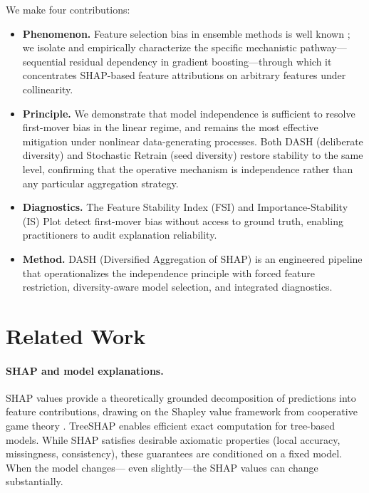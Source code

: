 \documentclass[11pt]{article}
\newcommand{\dash}{\textsc{DASH}}
\begin{document}
We make four contributions:
\begin{itemize}
  \item \textbf{Phenomenon.} Feature selection bias in ensemble methods
    is well known \citep{strobl2007bias, hooker2019please}; we isolate
    and empirically characterize the specific mechanistic
    pathway---sequential residual dependency in gradient
    boosting---through which it concentrates SHAP-based feature
    attributions on arbitrary features under collinearity.
  \item \textbf{Principle.} We demonstrate that model independence is
    sufficient to resolve first-mover bias in the linear regime, and
    remains the most effective mitigation under nonlinear
    data-generating processes.  Both \dash{} (deliberate diversity) and
    Stochastic Retrain (seed diversity) restore stability to the same
    level, confirming that the operative mechanism is independence
    rather than any particular aggregation strategy.
  \item \textbf{Diagnostics.} The Feature Stability Index (FSI) and
    Importance-Stability (IS) Plot detect first-mover bias without
    access to ground truth, enabling practitioners to audit explanation
    reliability.
  \item \textbf{Method.} \dash{} (Diversified Aggregation of SHAP) is
    an engineered pipeline that operationalizes the independence principle
    with forced feature restriction, diversity-aware model selection,
    and integrated diagnostics.
\end{itemize}


\section{Related Work}
\label{sec:related}

\paragraph{SHAP and model explanations.}
SHAP values \citep{lundberg2017unified} provide a theoretically grounded
decomposition of predictions into feature contributions, drawing on the
Shapley value framework from cooperative game theory
\citep{shapley1953value}. TreeSHAP \citep{lundberg2020local} enables
efficient exact computation for tree-based models. While SHAP satisfies
desirable axiomatic properties (local accuracy, missingness, consistency),
these guarantees are conditioned on a fixed model. When the model changes---
even slightly---the SHAP values can change substantially.
\end{document}
